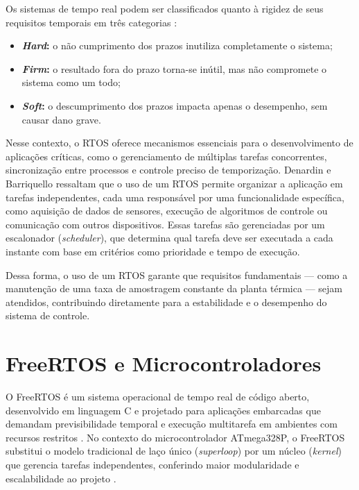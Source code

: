 \documentclass[repeatfields,xlists,xpacks,oneside]{ufrgscca}
\begin{document}
Os sistemas de tempo real podem ser classificados quanto à rigidez de seus requisitos temporais em três categorias \cite{SPOHN:FreeRTOS-Arduino-2019}:

\begin{itemize}
    \item \textbf{\textit{Hard}:} o não cumprimento dos prazos inutiliza completamente o sistema;

    \item \textbf{\textit{Firm}:} o resultado fora do prazo torna-se inútil, mas não compromete o sistema como um todo;

    \item \textbf{\textit{Soft}:} o descumprimento dos prazos impacta apenas o desempenho, sem causar dano grave.
\end{itemize}

Nesse contexto, o RTOS oferece mecanismos essenciais para o desenvolvimento de aplicações críticas, como o gerenciamento de múltiplas tarefas concorrentes, sincronização entre processos e controle preciso de temporização. Denardin e Barriquello \citeyear{denardin2019rtos} ressaltam que o uso de um RTOS permite organizar a aplicação em tarefas independentes, cada uma responsável por uma funcionalidade específica, como aquisição de dados de sensores, execução de algoritmos de controle ou comunicação com outros dispositivos. Essas tarefas são gerenciadas por um escalonador (\textit{scheduler}), que determina qual tarefa deve ser executada a cada instante com base em critérios como prioridade e tempo de execução.

Dessa forma, o uso de um RTOS garante que requisitos fundamentais --- como a manutenção de uma taxa de amostragem constante da planta térmica --- sejam atendidos, contribuindo diretamente para a estabilidade e o desempenho do sistema de controle.

\section{FreeRTOS e Microcontroladores}

O FreeRTOS é um sistema operacional de tempo real de código aberto, desenvolvido em linguagem C e projetado para aplicações embarcadas que demandam previsibilidade temporal e execução multitarefa em ambientes com recursos restritos \cite{barry2016freertos}. No contexto do microcontrolador ATmega328P, o FreeRTOS substitui o modelo tradicional de laço único (\textit{superloop}) por um núcleo (\textit{kernel}) que gerencia tarefas independentes, conferindo maior modularidade e escalabilidade ao projeto \cite{SPOHN:FreeRTOS-Arduino-2019}.
\end{document}
